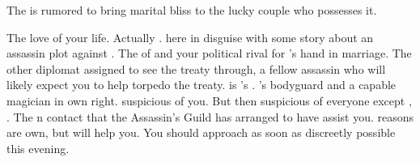 \documentclass[char]{NeptuneBall}
\begin{document}
\begin{itemz}[Trivia]
  \item The \iGlowShell{\MYname} is rumored to bring marital bliss to the lucky couple who possesses it.
\end{itemz}

\begin{contacts}
  \contact{\cPrincess{}} The love of your life.
  \contact{\cQueen{\MYname}} Actually \cQueen{}. \cQueen{\They} \cQueen{\are} here in disguise with some story about an assassin plot against \cKing{\King} \cKing{}.
  \contact{\cPrince{}} The \cPrince{\prince} of \pPacifica{} and your political rival for \cPrincess{}'s hand in marriage.
  \contact{\cSpy{}} The other diplomat assigned to see the treaty through, a fellow assassin who will likely expect you to help torpedo the treaty. \cSpy{} is \cBodyguard{}'s \cSpy{\sibling}.
  \contact{\cBodyguard{}} \cPrince{}'s bodyguard and a capable magician in \cBodyguard{\their} own right. \cBodyguard{\They} \cBodyguard{\seem} suspicious of you. But then \cBodyguard{\they} \cBodyguard{\are} suspicious of everyone except \cBodyguard{\their} \cSpy{\sibling}, \cSpy{}.
  \contact{\cManta{}} The \pAtlantis{}n contact that the Assassin's Guild has arranged to have assist you. \cManta{\Their} reasons are \cManta{\their} own, but \cManta{\they} will help you. You should approach \cManta{\them} as soon as discreetly possible this evening.
\end{contacts}
\end{document}
